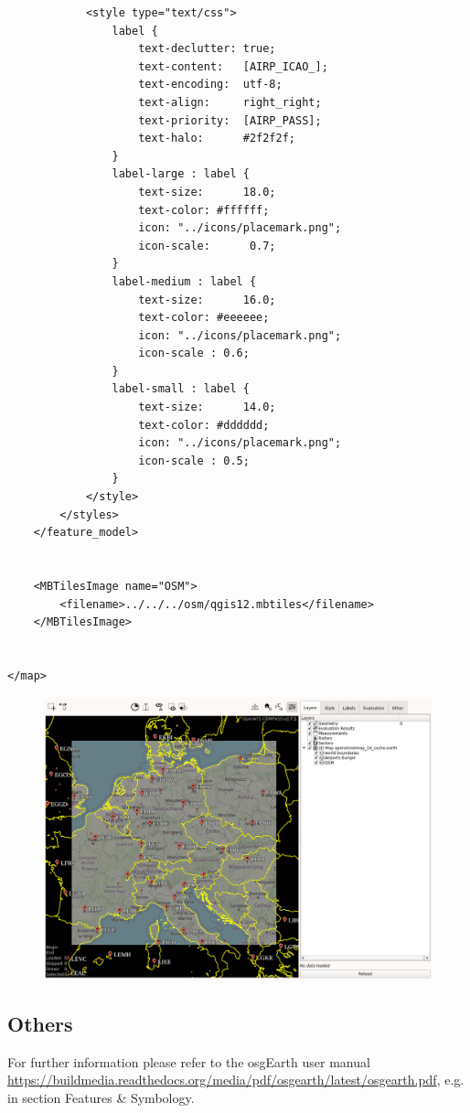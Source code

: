 \begin{lstlisting}
            <style type="text/css">   
                label {
                    text-declutter: true;
                    text-content:   [AIRP_ICAO_];
                    text-encoding:  utf-8;
                    text-align:     right_right;
                    text-priority:  [AIRP_PASS];
                    text-halo:      #2f2f2f;
                }                
                label-large : label {
                    text-size:      18.0;
                    text-color: #ffffff;
                    icon: "../icons/placemark.png";
                    icon-scale:      0.7;
                }
                label-medium : label {
                    text-size:      16.0;
                    text-color: #eeeeee;
                    icon: "../icons/placemark.png";
                    icon-scale : 0.6;
                }           
                label-small : label {
                    text-size:      14.0;
                    text-color: #dddddd;
                    icon: "../icons/placemark.png";
                    icon-scale : 0.5;
                }
            </style>
        </styles>
    </feature_model>
    
    
    <MBTilesImage name="OSM">
        <filename>../../../osm/qgis12.mbtiles</filename>
    </MBTilesImage>

    
</map>

\end{lstlisting}

\begin{figure}[H]
    \hspace*{-2.5cm}
    \includegraphics[width=19cm,frame]{figures/geoview_qgis_osm2.png}
\end{figure}

 
\subsection{Others}

For further information please refer to the osgEarth user manual \url{https://buildmedia.readthedocs.org/media/pdf/osgearth/latest/osgearth.pdf}, e.g. in section Features \& Symbology.

